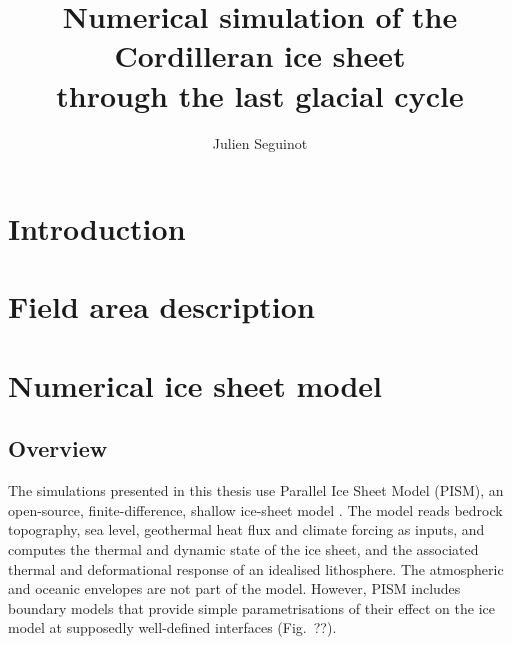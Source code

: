 \documentclass{article}
\title{Numerical simulation of the Cordilleran ice sheet \\
       through the last glacial cycle}
\author{Julien Seguinot}
\begin{document}

\maketitle
\linenumbers

\section{Introduction}
\label{sec:intro}


\section{Field area description}


\section{Numerical ice sheet model}

\subsection{Overview}

The simulations presented in this thesis use Parallel Ice Sheet Model (PISM),
an open-source, finite-difference, shallow ice-sheet model
\citep{PISM-authors.2014}. The model reads bedrock topography, sea level,
geothermal heat flux and climate forcing as inputs, and computes the thermal
and dynamic state of the ice sheet, and the associated thermal and
deformational response of an idealised lithosphere. The atmospheric and oceanic
envelopes are not part of the model. However, PISM includes boundary models
that provide simple parametrisations of their effect on the ice model at
supposedly well-defined interfaces (Fig.~??).
\end{document}

